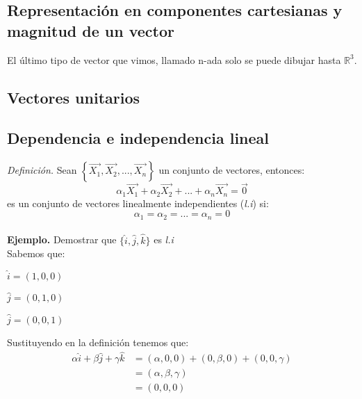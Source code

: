 \documentclass[12pt,openany]{book}
\begin{document}
	    \subsection{Representaci\'on en componentes cartesianas y magnitud de un vector}    
	    
	    El \'ultimo tipo de vector que vimos, llamado n-ada solo se puede dibujar hasta 
	    $\mathbb{R}^3$. 

	    \subsection{Vectores unitarios}

	    \subsection{Dependencia e independencia lineal}

	    \textsl{Definici\'on.} Sean $ \left\lbrace \vec{X_{1}}, \vec{X_{2}}, ... ,
	    							\vec{X_{n}} \right\rbrace $ un conjunto de vectores, entonces:
	    							$$ \alpha_{1} \vec{X_{1}}+\alpha_{2} \vec{X_{2}}+
	    							...+\alpha_{n} \vec{X_{n}} = \vec{0} $$
	    							es un conjunto de vectores linealmente independientes (\textsl{l.i}) 
	    							si: $$\alpha_{1} = \alpha_{2} = ... = \alpha_{n} = 0 $$\\
		\textbf{Ejemplo.} Demostrar que $\lbrace\hat{i}, \hat{j}, \hat{k}\rbrace $ es \textsl{l.i}\\
	    \noindent Sabemos que:
	    \begin{multicols}{3}
	    $  \hat{i} = (1,0,0) $
        \columnbreak
        
	    $  \hat{j} = (0,1,0) $
	   \columnbreak
	   
	   $   \hat{j} = (0,0,1) $
	    \end{multicols}

	    \noindent Sustituyendo en la definici\'on tenemos que:
	    \begin{equation*}
	    	\begin{split}
				\alpha \hat{i} + \beta \hat{j} + \gamma \hat{k}	
				&= (\alpha, 0,0) + (0,\beta,0) + (0,0,\gamma)\\
				&= (\alpha, \beta, \gamma)		\\	
				&=(0,0,0)
			\end{split}
		\end{equation*}
\end{document}
